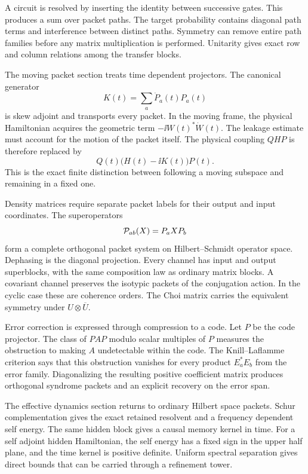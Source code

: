 A circuit is resolved by inserting the identity between successive gates. This produces a sum over packet paths. The target probability contains diagonal path terms and interference between distinct paths. Symmetry can remove entire path families before any matrix multiplication is performed. Unitarity gives exact row and column relations among the transfer blocks.

The moving packet section treats time dependent projectors. The canonical generator
\[
K(t)=\sum_a\dot P_a(t)P_a(t)
\]
is skew adjoint and transports every packet. In the moving frame, the physical Hamiltonian acquires the geometric term \(-\ii W(t)^*\dot W(t)\). The leakage estimate must account for the motion of the packet itself. The physical coupling \(QHP\) is therefore replaced by
\[
Q(t)\bigl(H(t)-\ii K(t)\bigr)P(t).
\]
This is the exact finite distinction between following a moving subspace and remaining in a fixed one.

Density matrices require separate packet labels for their output and input coordinates. The superoperators
\[
\Pcal_{ab}(X)=P_aXP_b
\]
form a complete orthogonal packet system on Hilbert--Schmidt operator space. Dephasing is the diagonal projection. Every channel has input and output superblocks, with the same composition law as ordinary matrix blocks. A covariant channel preserves the isotypic packets of the conjugation action. In the cyclic case these are coherence orders. The Choi matrix carries the equivalent symmetry under \(U\otimes\overline U\).

Error correction is expressed through compression to a code. Let \(P\) be the code projector. The class of \(PAP\) modulo scalar multiples of \(P\) measures the obstruction to making \(A\) undetectable within the code. The Knill--Laflamme criterion says that this obstruction vanishes for every product \(E_a^*E_b\) from the error family. Diagonalizing the resulting positive coefficient matrix produces orthogonal syndrome packets and an explicit recovery on the error span.

The effective dynamics section returns to ordinary Hilbert space packets. Schur complementation gives the exact retained resolvent and a frequency dependent self energy. The same hidden block gives a causal memory kernel in time. For a self adjoint hidden Hamiltonian, the self energy has a fixed sign in the upper half plane, and the time kernel is positive definite. Uniform spectral separation gives direct bounds that can be carried through a refinement tower.

